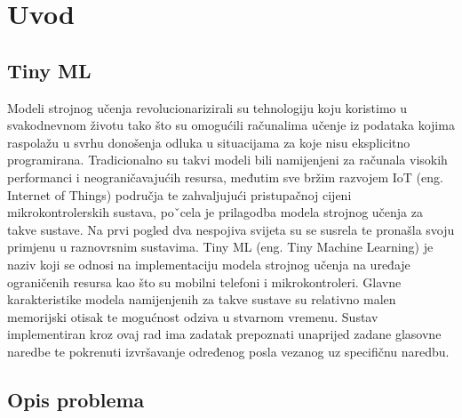 \chapter{Uvod}
\label{pog:uvod}

\section{Tiny ML}

Modeli strojnog učenja revolucionarizirali su tehnologiju koju koristimo u svakodnevnom
životu tako što su omogućili računalima učenje iz podataka kojima raspolažu u svrhu
donošenja odluka u situacijama za koje nisu eksplicitno programirana. Tradicionalno
su takvi modeli bili namijenjeni za računala visokih performanci i neograničavajućih
resursa, međutim sve bržim razvojem IoT (eng. Internet of Things) područja te
zahvaljujući pristupačnoj cijeni mikrokontrolerskih sustava, poˇcela je prilagodba
modela strojnog učenja za takve sustave. Na prvi pogled dva nespojiva svijeta
su se susrela te pronašla svoju primjenu u raznovrsnim sustavima.
Tiny ML (eng. Tiny Machine Learning) je naziv koji se odnosi na implementaciju
modela strojnog učenja na uređaje ograničenih resursa kao što su mobilni telefoni
i mikrokontroleri. Glavne karakteristike modela namijenjenih za takve sustave su
relativno malen memorijski otisak te mogućnost odziva u stvarnom vremenu. Sustav
implementiran kroz ovaj rad ima zadatak prepoznati unaprijed zadane glasovne
naredbe te pokrenuti izvršavanje određenog posla vezanog uz specifičnu naredbu.

\section{Opis problema}

